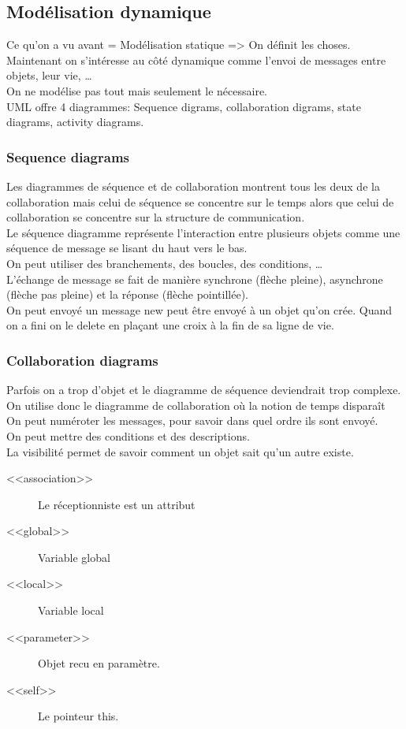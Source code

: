 \subsection{Modélisation dynamique}
Ce qu’on a vu avant = Modélisation statique => On définit les choses.
\\Maintenant on s’intéresse au côté dynamique comme l’envoi de messages entre objets, leur vie, …
\\On ne modélise pas tout mais seulement le nécessaire.
\\UML offre 4 diagrammes: Sequence digrams, collaboration digrams, state diagrams, activity diagrams.

\subsubsection{Sequence diagrams}
Les diagrammes de séquence et de collaboration montrent tous les deux de la collaboration mais celui de séquence se concentre sur le temps alors que celui de collaboration se concentre sur la structure de communication.
\\Le séquence diagramme représente l'interaction entre plusieurs objets comme une séquence de message se lisant du haut vers le bas.
\\On peut utiliser des branchements, des boucles, des conditions, …
\\L’échange de message se fait de manière synchrone (flèche pleine), asynchrone (flèche pas pleine) et la réponse (flèche pointillée).
\\On peut envoyé un message new peut être envoyé à un objet qu’on crée. Quand on a fini on le delete en plaçant une croix à la fin de sa ligne de vie.

\subsubsection{Collaboration diagrams}
Parfois on a trop d’objet et le diagramme de séquence deviendrait trop complexe.
\\On utilise donc le diagramme de collaboration où la notion de temps disparaît
\\On peut numéroter les messages, pour savoir dans quel ordre ils sont envoyé.
\\On peut mettre des conditions et des descriptions.
\\La visibilité permet de savoir comment un objet sait qu’un autre existe.

\begin{description}
	\item [<<association>>] Le réceptionniste est un attribut
	\item [<<global>>] Variable global
	\item [<<local>>] Variable local
	\item [<<parameter>>] Objet recu en paramètre.
	\item [<<self>>] Le pointeur this.
\end{description}
